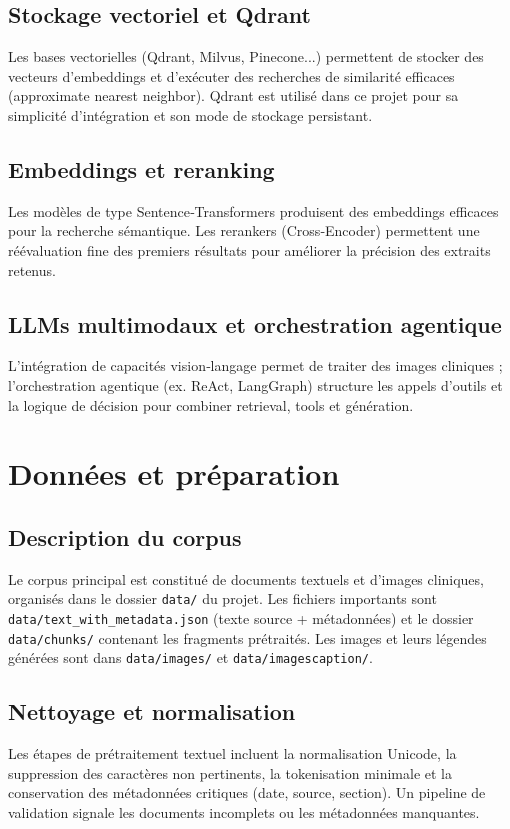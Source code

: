 \documentclass[12pt,a4paper]{report}
\begin{document}
\section{Stockage vectoriel et Qdrant}
Les bases vectorielles (Qdrant, Milvus, Pinecone...) permettent de stocker des vecteurs d'embeddings et d'exécuter des recherches de similarité efficaces (approximate nearest neighbor). Qdrant est utilisé dans ce projet pour sa simplicité d'intégration et son mode de stockage persistant.

\section{Embeddings et reranking}
Les modèles de type Sentence‑Transformers produisent des embeddings efficaces pour la recherche sémantique. Les rerankers (Cross‑Encoder) permettent une réévaluation fine des premiers résultats pour améliorer la précision des extraits retenus.

\section{LLMs multimodaux et orchestration agentique}
L'intégration de capacités vision‑langage permet de traiter des images cliniques ; l'orchestration agentique (ex. ReAct, LangGraph) structure les appels d'outils et la logique de décision pour combiner retrieval, tools et génération.

\chapter{Données et préparation}
\section{Description du corpus}
Le corpus principal est constitué de documents textuels et d'images cliniques, organisés dans le dossier \texttt{data/} du projet. Les fichiers importants sont \texttt{data/text\_with\_metadata.json} (texte source + métadonnées) et le dossier \texttt{data/chunks/} contenant les fragments prétraités. Les images et leurs légendes générées sont dans \texttt{data/images/} et \texttt{data/imagescaption/}.

\section{Nettoyage et normalisation}
Les étapes de prétraitement textuel incluent la normalisation Unicode, la suppression des caractères non pertinents, la tokenisation minimale et la conservation des métadonnées critiques (date, source, section). Un pipeline de validation signale les documents incomplets ou les métadonnées manquantes.
\end{document}
